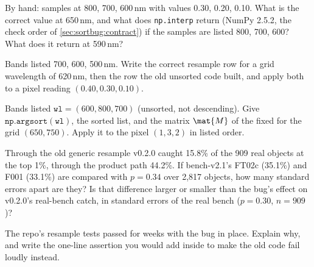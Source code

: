\begin{checkyourself}
\item\label{ex:sortbug:1} By hand: samples at 800, 700, 600\,nm with values 0.30, 0.20, 0.10. What is the correct
  value at 650\,nm, and what does \texttt{np.interp} return (NumPy 2.5.2, the check order of
  \cref{sec:sortbug:contract}) if the samples are listed 800, 700, 600? What does it return at 590\,nm?
\item\label{ex:sortbug:2} Bands listed 700, 600, 500\,nm. Write the correct resample row for a grid wavelength of
  620\,nm, then the row the old unsorted code built, and apply both to a pixel reading $(0.40, 0.30, 0.10)$.
\item\label{ex:sortbug:3} Bands listed $\mathtt{wl} = (600, 800, 700)$ (unsorted, not descending). Give
  $\mathtt{np.argsort(wl)}$, the sorted list, and the matrix $\mat{M}$ of the fixed  for the
  grid $(650, 750)$. Apply it to the pixel $(1, 3, 2)$ in listed order.
\item\label{ex:sortbug:4} Through the old generic resample v0.2.0 caught 15.8\% of the 909 real objects at the top
  1\%, through the product path 44.2\%. If bench-v2.1's FT02c (35.1\%) and F001 (33.1\%) are compared with
  $p = 0.34$ over 2,817 objects, how many standard errors apart are they? Is that difference larger or smaller
  than the bug's effect on v0.2.0's real-bench catch, in standard errors of the real bench ($p = 0.30$, $n = 909$)?
\item\label{ex:sortbug:5} The repo's resample tests passed for weeks with the bug in place. Explain why, and write
  the one-line assertion you would add inside  to make the old code fail loudly instead.
\end{checkyourself}
\endgroup

